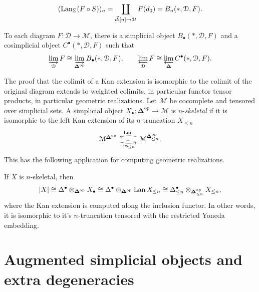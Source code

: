  \[
	 (\operatorname{Lan}_\Sigma(F\circ S))_n=\coprod_{\vec{d} : [n] \to \mathcal{D} } F(d_0)=B_n(*,\mathcal{D} ,F)
 .\]
 \begin{lemma}\label{lma:4.1}
	 To each diagram $F : \mathcal{D}  \to \mathcal{M} $, there is a simplicial object $B_{\bullet} (*,\mathcal{D} ,F)$ and a cosimplicial object $C^{\bullet} (*,\mathcal{D} ,F)$ such that
	 \[
	 	\varinjlim _\mathcal{D} F\cong\varinjlim _{\boldsymbol{\Delta} ^{\mathrm{op}} } B_{\bullet} (*,\mathcal{D} ,F),\qquad \varprojlim _\mathcal{D} F\cong \varprojlim _{\boldsymbol{\Delta} } C^{\bullet} (*,\mathcal{D} ,F)
	 .\]
 \end{lemma}
 \begin{remark}
 	The proof that the colimit of a Kan extension is isomorphic to the colimit of the original diagram extends to weighted colimits, in particular functor tensor products, in particular geometric realizations. Let $\mathcal{M} $ be cocomplete and tensored over simplicial sets. A simplicial object $X_{\bullet} : \boldsymbol{\Delta} ^{\mathrm{op}}  \to \mathcal{M} $ is $n$-\emph{skeletal} if it is isomorphic to the left Kan extension of its $n$-truncation $X_{\leq n} $
	\[\begin{tikzcd}
	{\mathcal{M}^{\boldsymbol{\Delta}^{\mathrm{op}}}} & {\mathcal{M}^{\boldsymbol{\Delta}_{\leq n}^{\mathrm{op}}}}.
	\arrow[""{name=0, anchor=center, inner sep=0}, "{\mathrm{res}_{\leq n}}"', bend right=12, from=1-1, to=1-2]
	\arrow[""{name=1, anchor=center, inner sep=0}, "{\mathrm{Lan}}"', bend right=12, from=1-2, to=1-1]
	\arrow["\dashv"{anchor=center, rotate=-90}, draw=none, from=1, to=0]
\end{tikzcd}\]
This has the following application for computing geometric realizations.
 \end{remark}
 
 \begin{lemma}\label{lma:4.2}
 	If $X$ is $n$-skeletal, then
	\[
		\left| X \right| \cong\Delta^{\bullet} \otimes _{\boldsymbol{\Delta} ^{\mathrm{op}} } X_{\bullet} \cong\Delta^{\bullet} \otimes _{\boldsymbol{\Delta} ^{\mathrm{op}} } \operatorname{Lan} X_{\leq n} \cong \Delta^{\bullet}_{\leq n} \otimes _{\boldsymbol{\Delta} ^{\mathrm{op}} _{\leq n} } X_{\leq n} ,
	\]
	where the Kan extension is computed along the inclusion functor. In other words, it is isomorphic to it's $n$-truncation tensored with the restricted Yoneda embedding.
 \end{lemma}
 
 \section{Augmented simplicial objects and extra degeneracies}

